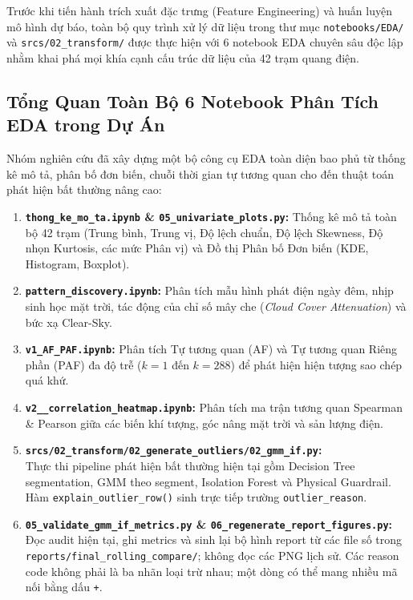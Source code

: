 \documentclass[12pt,a4paper]{article}
\begin{document}
Trước khi tiến hành trích xuất đặc trưng (Feature Engineering) và huấn luyện mô hình dự báo, toàn bộ quy trình xử lý dữ liệu trong thư mục \texttt{notebooks/EDA/} và \texttt{srcs/02\_transform/} được thực hiện với 6 notebook EDA chuyên sâu độc lập nhằm khai phá mọi khía cạnh cấu trúc dữ liệu của 42 trạm quang điện.



\subsection{Tổng Quan Toàn Bộ 6 Notebook Phân Tích EDA trong Dự Án}
Nhóm nghiên cứu đã xây dựng một bộ công cụ EDA toàn diện bao phủ từ thống kê mô tả, phân bố đơn biến, chuỗi thời gian tự tương quan cho đến thuật toán phát hiện bất thường nâng cao:

\begin{enumerate}
    \item \textbf{\texttt{thong\_ke\_mo\_ta.ipynb} \& \texttt{05\_univariate\_plots.py}:} Thống kê mô tả toàn bộ 42 trạm (Trung bình, Trung vị, Độ lệch chuẩn, Độ lệch Skewness, Độ nhọn Kurtosis, các mức Phân vị) và Đồ thị Phân bố Đơn biến (KDE, Histogram, Boxplot).
    \item \textbf{\texttt{pattern\_discovery.ipynb}:} Phân tích mẫu hình phát điện ngày đêm, nhịp sinh học mặt trời, tác động của chỉ số mây che (\textit{Cloud Cover Attenuation}) và bức xạ Clear-Sky.
    \item \textbf{\texttt{v1\_AF\_PAF.ipynb}:} Phân tích Tự tương quan (AF) và Tự tương quan Riêng phần (PAF) đa độ trễ ($k=1$ đến $k=288$) để phát hiện hiện tượng sao chép quá khứ.
    \item \textbf{\texttt{v2\_\_correlation\_heatmap.ipynb}:} Phân tích ma trận tương quan Spearman \& Pearson giữa các biến khí tượng, góc nâng mặt trời và sản lượng điện.
    \item \textbf{\texttt{srcs/02\_transform/02\_generate\_outliers/02\_gmm\_if.py}:}\\Thực thi pipeline phát hiện bất thường hiện tại gồm Decision Tree segmentation, GMM theo segment, Isolation Forest và Physical Guardrail. Hàm \texttt{explain\_outlier\_row()} sinh trực tiếp trường \texttt{outlier\_reason}.
    \item \textbf{\texttt{05\_validate\_gmm\_if\_metrics.py} \& \texttt{06\_regenerate\_report\_figures.py}:}\\Đọc audit hiện tại, ghi metrics và sinh lại bộ hình report từ các file số trong \texttt{reports/final\_rolling\_compare/}; không đọc các PNG lịch sử. Các reason code không phải là ba nhãn loại trừ nhau; một dòng có thể mang nhiều mã nối bằng dấu \texttt{+}.
\end{enumerate}
\end{document}
